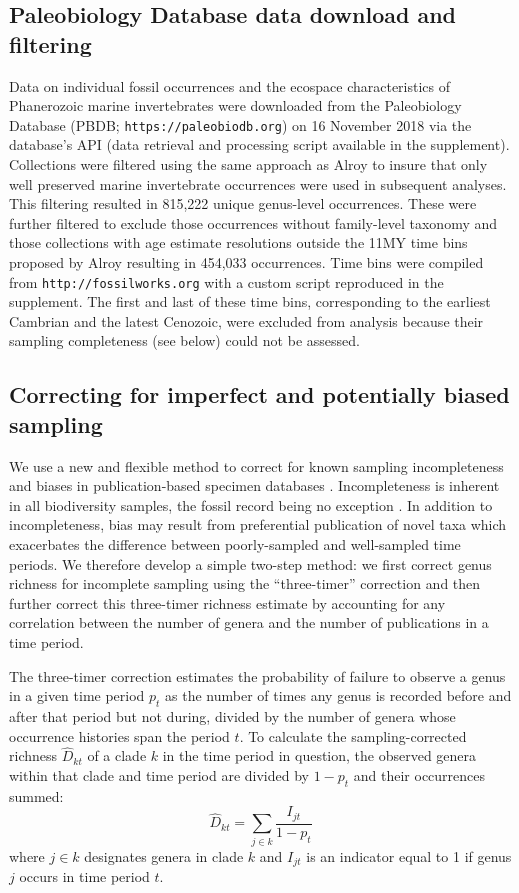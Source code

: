 \documentclass[12pt]{article}
\let\citep=\cite
\begin{document}
\subsection{Paleobiology Database data download and filtering}
Data on individual fossil occurrences and the ecospace characteristics
of Phanerozoic marine invertebrates were downloaded from the
Paleobiology Database (PBDB; \newline\texttt{https://paleobiodb.org}) on 16
November 2018 via the database's API (data retrieval and processing
script available in the supplement). Collections were filtered using
the same approach as Alroy \citep{alroy08} to insure that only well
preserved marine invertebrate occurrences were used in subsequent
analyses. This filtering resulted in 815,222 unique genus-level
occurrences. These were further filtered to exclude those occurrences
without family-level taxonomy and those collections with age estimate
resolutions outside the 11MY time bins proposed by Alroy
\citep{alroy08} resulting in 454,033 occurrences. Time bins were
compiled from {\tt http://fossilworks.org} with a custom script
reproduced in the supplement. The first and last of these time bins,
corresponding to the earliest Cambrian and the latest Cenozoic, were
excluded from analysis because their sampling completeness (see below)
could not be assessed.


\subsection{Correcting for imperfect and potentially biased sampling}
\label{sec:3TP}
We use a new and flexible method to correct for known sampling
incompleteness and biases in publication-based specimen databases
\citep{alroy08, alroy2010}. Incompleteness is inherent in all
biodiversity samples, the fossil record being no exception
\citep{miller1996, foote2016, starrfelt2016, close2018}.  In addition
to incompleteness, bias may result from preferential publication of
novel taxa \citep{alroy2010} which exacerbates the difference between
poorly-sampled and well-sampled time periods. We therefore develop a
simple two-step method: we first correct genus richness for incomplete
sampling using the ``three-timer'' correction \citep{alroy08} and then
further correct this three-timer richness estimate by accounting for
any correlation between the number of genera and the number of
publications in a time period.

The three-timer correction estimates the probability of failure to
observe a genus in a given time period $p_t$ as the number of times
any genus is recorded before and after that period but not during,
divided by the number of genera whose occurrence histories span the
period $t$.  To calculate the sampling-corrected richness
$\hat{D}_{kt}$ of a clade $k$ in the time period in question, the
observed genera within that clade and time period are divided by
$1 - p_t$ and their occurrences summed:
\begin{equation}
  \hat{D}_{kt} = \sum_{j \in k} \frac{I_{jt}}{1 - p_t}
\end{equation}
where $j \in k$ designates genera in clade $k$ and $I_{jt}$ is an
indicator equal to 1 if genus $j$ occurs in time period $t$.
\end{document}
